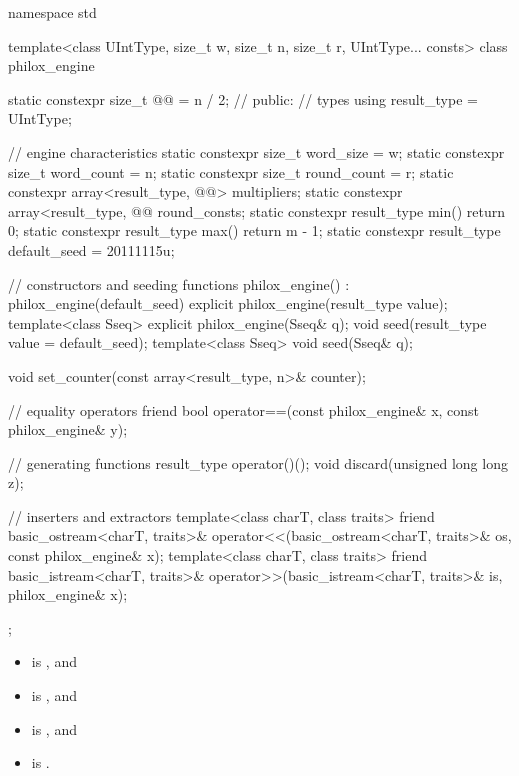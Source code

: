 %
%
\begin{codeblock}
namespace std {
  template<class UIntType, size_t w, size_t n, size_t r, UIntType... consts>
  class philox_engine {
    static constexpr size_t @@ = n / 2;   // \expos
  public:
    // types
    using result_type = UIntType;

    // engine characteristics
    static constexpr size_t word_size = w;
    static constexpr size_t word_count = n;
    static constexpr size_t round_count = r;
    static constexpr array<result_type, @@> multipliers;
    static constexpr array<result_type, @@ round_consts;
    static constexpr result_type min() { return 0; }
    static constexpr result_type max() { return m - 1; }
    static constexpr result_type default_seed = 20111115u;

    // constructors and seeding functions
    philox_engine() : philox_engine(default_seed) {}
    explicit philox_engine(result_type value);
    template<class Sseq> explicit philox_engine(Sseq& q);
    void seed(result_type value = default_seed);
    template<class Sseq> void seed(Sseq& q);

    void set_counter(const array<result_type, n>& counter);

    // equality operators
    friend bool operator==(const philox_engine& x, const philox_engine& y);

    // generating functions
    result_type operator()();
    void discard(unsigned long long z);

    // inserters and extractors
    template<class charT, class traits>
      friend basic_ostream<charT, traits>&
        operator<<(basic_ostream<charT, traits>& os, const philox_engine& x);
    template<class charT, class traits>
      friend basic_istream<charT, traits>&
        operator>>(basic_istream<charT, traits>& is, philox_engine& x);
  };
}
\end{codeblock}

\pnum
\mandates
\begin{itemize}
\item {} is , and
\item {} is , and
\item {} is , and
\item {} is .
\end{itemize}

